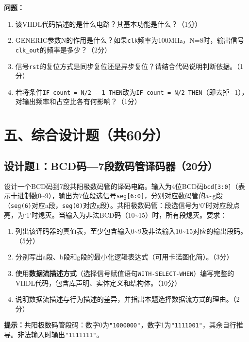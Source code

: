 \begin{framed}
\textbf{问题：}
\begin{enumerate}[label=(\arabic*)]
  \item 该VHDL代码描述的是什么电路？其基本功能是什么？（1分）
  \item GENERIC参数N的作用是什么？如果\texttt{clk}频率为100MHz，N=8时，输出信号\texttt{clk\_out}的频率是多少？（2分）
  \item 信号\texttt{rst}的复位方式是同步复位还是异步复位？请结合代码说明判断依据。（1分）
  \item 若将条件\texttt{IF count = N/2 - 1 THEN}改为\texttt{IF count = N/2 THEN}（即去掉$-1$），对输出频率和占空比各有何影响？（1分）
\end{enumerate}
\end{framed}

\newpage

\section*{五、综合设计题（共60分）}

\subsection*{设计题1：BCD码—7段数码管译码器（20分）}

设计一个BCD码到7段共阳极数码管的译码电路。输入为4位BCD码\texttt{bcd[3:0]}（表示十进制数0\~{}9），输出为7位段选信号\texttt{seg[6:0]}，分别对应数码管的a\~{}g段（\texttt{seg(6)}对应a段，\texttt{seg(0)}对应g段）。共阳极数码管：段选信号为`0'时对应段点亮，为`1'时熄灭。当输入为非法BCD码（10\~{}15）时，所有段熄灭。要求：

\begin{enumerate}[label=(\arabic*)]
  \item 列出该译码器的真值表，至少包含输入0\~{}9及非法输入10\~{}15对应的输出段码。（5分）
  \item 分别写出a段、b段和g段的最小化逻辑表达式（可用卡诺图化简）。（3分）
  \item 使用\textbf{数据流描述方式}（选择信号赋值语句\texttt{WITH-SELECT-WHEN}）编写完整的VHDL代码，包含库声明、实体定义和结构体。（10分）
  \item 说明数据流描述与行为描述的差异，并指出本题选择数据流方式的理由。（2分）
\end{enumerate}

\begin{framed}
\textbf{提示：}共阳极数码管段码：数字0为\texttt{"1000000"}，数字1为\texttt{"1111001"}，其余自行推导。非法输入时输出\texttt{"1111111"}。
\end{framed}


